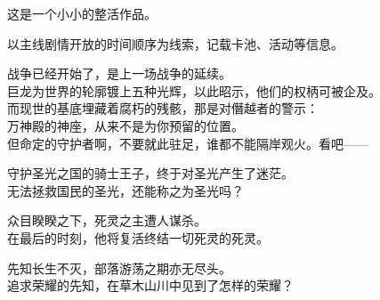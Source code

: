 \newcommand{\note}[1]{
    \fbox{\begin{minipage}{0.5\linewidth}
        #1
    \end{minipage}}
}
\newcommand{\tobecontinued}[0]{
    \clearpage\hspace{0.5\linewidth}\vspace{0.42\textheight}\par%
    \begin{minipage}{\linewidth}
        \center%
        以下为草稿
    \end{minipage}
    \clearpage
}














\fulldoctitle

这是一个小小的整活作品。

以主线剧情开放的时间顺序为线索，记载卡池、活动等信息。

{\Nmaketoc}\clearpage



战争已经开始了，是上一场战争的延续。\\
巨龙为世界的轮廓镀上五种光辉，以此昭示，他们的权柄可被企及。\\
而现世的基底埋藏着腐朽的残骸，那是对僭越者的警示：\\
万神殿的神座，从来不是为你预留的位置。\\
但命定的守护者啊，不要就此驻足，谁都不能隔岸观火。看吧——

守护圣光之国的骑士王子，终于对圣光产生了迷茫。\\
无法拯救国民的圣光，还能称之为圣光吗？

众目睽睽之下，死灵之主遭人谋杀。\\
在最后的时刻，他将复活终结一切死灵的死灵。

先知长生不灭，部落游荡之期亦无尽头。\\
追求荣耀的先知，在草木山川中见到了怎样的荣耀？

